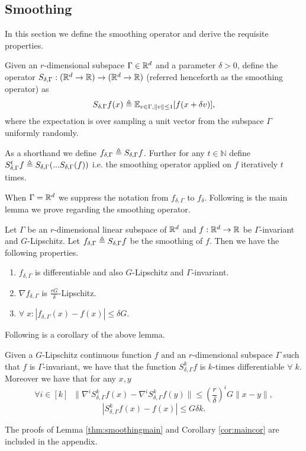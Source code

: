 \documentclass[final,12pt]{colt2018} %
\def\smooth#1{#1_{\delta,\Gamma}}
\begin{document}
\subsection{Smoothing}
In this section we define the smoothing operator and derive the requisite properties.
\begin{definition}
\label{def:smoothingoperator}
Given an $r$-dimensional subspace $\Gamma \in {\mathbb R}^d$ and a parameter $\delta > 0$, define the operator $S_{\delta,\Gamma}:({\mathbb R}^d \rightarrow {\mathbb R}) \rightarrow ({\mathbb R}^d \rightarrow {\mathbb R})$ (referred henceforth as the smoothing operator) as 
  \[ S_{\delta, \Gamma}f(x) \triangleq \mathbb{E}_{v \in \Gamma, \|v\| \leq 1}[ f(x + \delta v)],\]
  where the expectation is over sampling a unit vector from the subspace $\Gamma$ uniformly randomly. 
  

  As a shorthand we define $f_{\delta, \Gamma} \triangleq S_{\delta, \Gamma}f$. Further for any $t \in \mathbb{N}$ define $S_{\delta,\Gamma}^t f \triangleq S_{\delta,\Gamma}(... S_{\delta,\Gamma}( f )) $ i.e. the smoothing operator applied on $f$ iteratively $t$ times.
\end{definition}
When $\Gamma = {\mathbb R}^d$ we suppress the notation from $f_{\delta, \Gamma}$ to $f_{\delta}$. Following is the main lemma we prove regarding the smoothing operator. 
\begin{lemma}
  \label{thm:smoothingmain}
  Let $\Gamma $ be an $r$-dimensional linear subspace of ${\mathbb R}^d$ and $f : {\mathbb R}^d \rightarrow {\mathbb R}$ be $\Gamma$-invariant and $G$-Lipschitz. Let $\smooth{f} \defeq S_{\delta, \Gamma} f$ be the smoothing of $f$. Then we have the following properties.
  \begin{enumerate}
    \item $\smooth{f}$ is differentiable and also $G$-Lipschitz and $\Gamma$-invariant.
    \item $\nabla \smooth{f}$ is $\frac{rG}{\delta}$-Lipschitz.
    \item $\forall \;x: |f_{\delta,\Gamma}(x) - f(x)| \leq \delta G$.
  \end{enumerate}
  \end{lemma}

Following is a corollary of the above lemma. 
\begin{corollary}
\label{cor:maincor}
  Given a $G$-Lipschitz continuous function $f$ and an $r$-dimensional subspace $\Gamma$ such that $f$ is $\Gamma$-invariant, we have that the function $S_{\delta,\Gamma}^k f$ is $k$-times differentiable $\forall\;k$. Moreover we have that for any $x,y$
  \[ \forall i \in [k] \;\; \| \nabla^{i} S_{\delta,\Gamma}^k f(x) - \nabla^{i} S_{\delta,\Gamma}^k f(y)\| \leq \left(\frac{r}{\delta} \right)^iG\|x-y\|,\] 
  \[| S_{\delta,\Gamma}^k f(x) - f(x)| \leq G\delta k.\]
\end{corollary}
The proofs of Lemma \ref{thm:smoothingmain} and Corollary \ref{cor:maincor} are included in the appendix.
\end{document}
